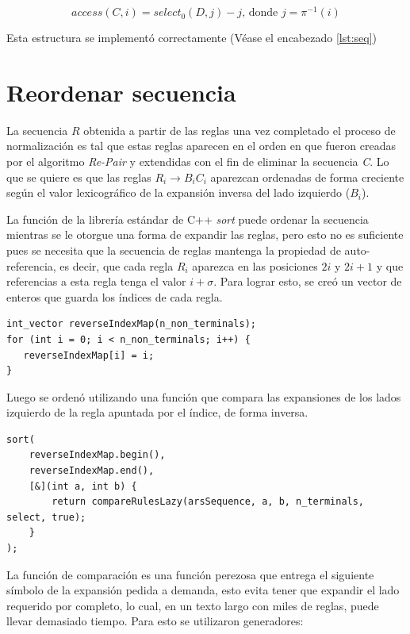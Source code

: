 \[
access(C, i) = select_{0}(D, j) - j \text{, donde } j = \pi ^{-1}(i)
\]

Esta estructura se implementó correctamente (Véase el encabezado \ref{lst:seq})

\section{Reordenar secuencia}
\label{sec:reordenar}

La secuencia $R$ obtenida a partir de las reglas una vez completado el proceso de normalización es tal que estas reglas aparecen en el orden en que fueron creadas por el algoritmo \textit{Re-Pair} y extendidas con el fin de eliminar la secuencia \textit{C}. Lo que se quiere es que las reglas $R_i \rightarrow B_i C_i$ aparezcan ordenadas de forma creciente según el valor lexicográfico de la expansión inversa del lado izquierdo ($B_i$). 


La función de la librería estándar de C++ \textit{sort} puede ordenar la secuencia mientras se le otorgue una forma de expandir las reglas, pero esto no es suficiente pues se necesita que la secuencia de reglas mantenga la propiedad de auto-referencia, es decir, que cada regla $R_i$ aparezca en las posiciones $2i$ y $2i+1$ y que referencias a esta regla tenga el valor $i + \sigma$. Para lograr esto, se creó un vector de enteros que guarda los índices de cada regla. 

\begin{lstlisting}[style=cppstyle, caption={Vector de índices}, label={lst:example}]
int_vector reverseIndexMap(n_non_terminals);
for (int i = 0; i < n_non_terminals; i++) {
   reverseIndexMap[i] = i;
}
\end{lstlisting}

Luego se ordenó utilizando una función que compara las expansiones de los lados izquierdo de la regla apuntada por el índice, de forma inversa.
\begin{lstlisting}[style=cppstyle, caption={\textit{sort}}, label={lst:sort1}] 
sort(
    reverseIndexMap.begin(), 
    reverseIndexMap.end(), 
    [&](int a, int b) { 
        return compareRulesLazy(arsSequence, a, b, n_terminals, select, true); 
    }
);
\end{lstlisting}
La función de comparación es una función perezosa que entrega el siguiente símbolo de la expansión pedida a demanda, esto evita tener que expandir el lado requerido por completo, lo cual, en un texto largo con miles de reglas, puede llevar demasiado tiempo. Para esto se utilizaron generadores:

